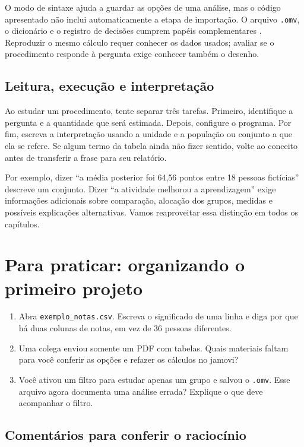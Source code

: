 O modo de sintaxe ajuda a guardar as opções de uma análise, mas o código apresentado não inclui automaticamente a etapa de importação. O arquivo \texttt{.omv}, o dicionário e o registro de decisões cumprem papéis complementares \parencite{JamoviR}. Reproduzir o mesmo cálculo requer conhecer os dados usados; avaliar se o procedimento responde à pergunta exige conhecer também o desenho.

\subsection{Leitura, execução e interpretação}

Ao estudar um procedimento, tente separar três tarefas. Primeiro, identifique a pergunta e a quantidade que será estimada. Depois, configure o programa. Por fim, escreva a interpretação usando a unidade e a população ou conjunto a que ela se refere. Se algum termo da tabela ainda não fizer sentido, volte ao conceito antes de transferir a frase para seu relatório.

Por exemplo, dizer ``a média posterior foi 64,56 pontos entre 18 pessoas fictícias'' descreve um conjunto. Dizer ``a atividade melhorou a aprendizagem'' exige informações adicionais sobre comparação, alocação dos grupos, medidas e possíveis explicações alternativas. Vamos reaproveitar essa distinção em todos os capítulos.

\section{Para praticar: organizando o primeiro projeto}

\begin{enumerate}
  \item Abra \texttt{exemplo\_notas.csv}. Escreva o significado de uma linha e diga por que há duas colunas de notas, em vez de 36 pessoas diferentes.
  \item Uma colega enviou somente um PDF com tabelas. Quais materiais faltam para você conferir as opções e refazer os cálculos no jamovi?
  \item Você ativou um filtro para estudar apenas um grupo e salvou o \texttt{.omv}. Esse arquivo agora documenta uma análise errada? Explique o que deve acompanhar o filtro.
\end{enumerate}

\subsection{Comentários para conferir o raciocínio}

